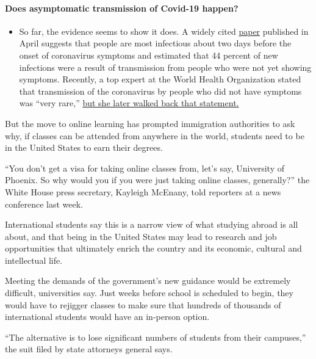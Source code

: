 \begin{itemize}
{  \paragraph{Does asymptomatic transmission of Covid-19
  happen?}\label{does-asymptomatic-transmission-of-covid-19-happen}}

  \begin{itemize}
  \tightlist
  \item
    So far, the evidence seems to show it does. A widely cited
    \href{https://www.nature.com/articles/s41591-020-0869-5}{paper}
    published in April suggests that people are most infectious about
    two days before the onset of coronavirus symptoms and estimated that
    44 percent of new infections were a result of transmission from
    people who were not yet showing symptoms. Recently, a top expert at
    the World Health Organization stated that transmission of the
    coronavirus by people who did not have symptoms was ``very rare,''
    \href{https://www.nytimes.com/2020/06/09/world/coronavirus-updates.html?action=click\&pgtype=Article\&state=default\&region=MAIN_CONTENT_3\&context=storylines_faq\#link-1f302e21}{but
    she later walked back that statement.}
  \end{itemize}
\end{itemize}

But the move to online learning has prompted immigration authorities to
ask why, if classes can be attended from anywhere in the world, students
need to be in the United States to earn their degrees.

``You don't get a visa for taking online classes from, let's say,
University of Phoenix. So why would you if you were just taking online
classes, generally?'' the White House press secretary, Kayleigh McEnany,
told reporters at a news conference last week.

International students say this is a narrow view of what studying abroad
is all about, and that being in the United States may lead to research
and job opportunities that ultimately enrich the country and its
economic, cultural and intellectual life.

Meeting the demands of the government's new guidance would be extremely
difficult, universities say. Just weeks before school is scheduled to
begin, they would have to rejigger classes to make sure that hundreds of
thousands of international students would have an in-person option.

``The alternative is to lose significant numbers of students from their
campuses,'' the suit filed by state attorneys general says.

